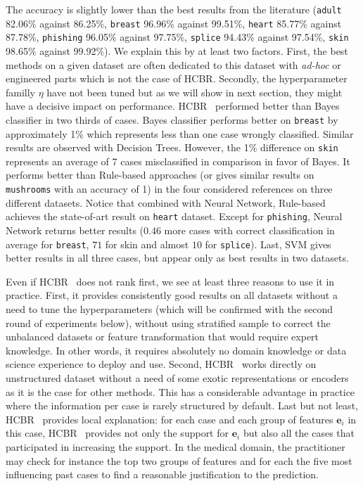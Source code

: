 \documentclass[preprint,12pt]{elsarticle}
\def\HCBR{{\sc HCBR}}
\theoremstyle{definition}
\begin{document}
The accuracy is slightly lower than the best results from the literature (\texttt{adult} 82.06\% against 86.25\%, \texttt{breast} 96.96\% against 99.51\%, \texttt{heart} 85.77\% against 87.78\%, \texttt{phishing} 96.05\% against 97.75\%, \texttt{splice} 94.43\% against 97.54\%, \texttt{skin} 98.65\% against 99.92\%). We explain this by at least two factors. First, the best methods on a given dataset are often dedicated to this dataset with {\it ad-hoc} or engineered parts which is not the case of \HCBR. Secondly, the hyperparameter familly $\eta$ have not been tuned but as we will show in next section, they might have a decisive impact on performance.
\HCBR~ performed better than Bayes classifier in two thirds of cases. Bayes classifier performs better on \texttt{breast} by approximately 1\% which represents less than one case wrongly classified. Similar results are observed with Decision Trees. However, the 1\% difference on \texttt{skin} represents an average of 7 cases misclassified in comparison in favor of Bayes. It performs better than Rule-based approaches (or gives similar results on \texttt{mushrooms} with an accuracy of 1) in the four considered references on three different datasets. Notice that combined with Neural Network, Rule-based achieves the state-of-art result on \texttt{heart} dataset. Except for \texttt{phishing}, Neural Network returns better results ($0.46$ more cases with correct classification in average for \texttt{breast}, $71$ for skin and almost $10$ for \texttt{splice}). Last, SVM gives better results in all three cases, but appear only as best results in two datasets.

Even if \HCBR~ does not rank first, we see at least three reasons to use it in practice. First, it provides consistently good results on all datasets without a need to tune the hyperparameters (which will be confirmed with the second round of experiments below), without using stratified sample to correct the unbalanced datasets or feature transformation that would require expert knowledge. In other words, it requires absolutely no domain knowledge or data science experience to deploy and use. Second, \HCBR~ works directly on unstructured dataset without a need of some exotic representations or encoders as it is the case for other methods. This has a considerable advantage in practice where the information per case is rarely structured by default. Last but not least, \HCBR~ provides local explanation: for each case and each group of features $\mathbf e_i$ in this case, \HCBR~ provides not only the support for $\mathbf e_i$ but also all the cases that participated in increasing the support. In the medical domain, the practitioner may check for instance the top two groups of features and for each the five most influencing past cases to find a reasonable justification to the prediction.
\end{document}

